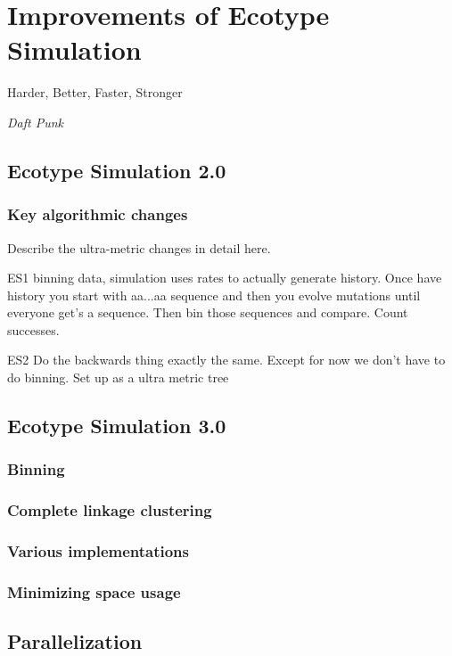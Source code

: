 \chapter{Improvements of Ecotype Simulation}

\begin{shadequote}
Harder, Better, Faster, Stronger \par\emph{Daft Punk}
\end{shadequote}


\section{Ecotype Simulation 2.0}
\subsection*{Key algorithmic changes}
Describe the ultra-metric changes in detail here.

ES1 binning data, simulation uses rates to actually generate history. Once have history you start with aa...aa sequence and then you evolve mutations until everyone get's a sequence. Then bin those sequences and compare. Count successes.


ES2 Do the backwards thing exactly the same. Except for now we don't have to do binning. Set up as a ultra metric tree



\section{Ecotype Simulation 3.0}
\subsection{Binning}
\subsection*{Complete linkage clustering}
\subsection*{Various implementations}
\subsection*{Minimizing space usage}
\section{Parallelization}
